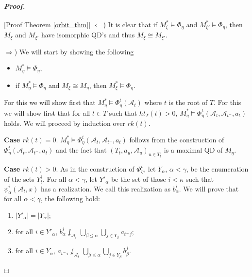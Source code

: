 \documentclass[12pt,a4paper]{amsart}
\theoremstyle{definition}
\theoremstyle{remark}
\newenvironment{cproof}{\paragraph{\emph{Proof.\,}}}{\hfill{$\boxminus$}\par\vspace{2mm}}
\begin{document}
\begin{cproof}[Proof Theorem \ref{orbit_thm}]
$\Leftarrow$) It is clear that if $M^*_\xi\models \Phi_\eta$ and $M^*_{\xi'}\models \Phi_\eta$, then $M_\xi$ and $M_{\xi'}$ have isomorphic QD's and thus $M_\xi\cong M_{\xi'}$.


$\Rightarrow$) We will start by showing the following
\begin{itemize}
    \item $M_\eta^*\models \Phi_\eta$,
    \item if $M_\eta^*\models \Phi_\eta$ and $M_\xi\cong M_\eta$, then $M_\xi^*\models\Phi_\eta$. 
\end{itemize}

For this we will show first that $M_\eta^*\models\Phi_\eta^t(\mathcal{A}_t)$ where $t$ is the root of $T$. For this we will show first that for all $t\in T$ such that $ht_T(t)>0$,  $M_\eta^*\models\Phi_\eta^t(\mathcal{A}_t,\mathcal{A}_{t^-},a_t)$ holds. We will proceed by induction over $rk(t)$. 



{\bf Case $rk(t)=0$}. $M_\eta^*\models\Phi_\eta^t(\mathcal{A}_t,\mathcal{A}_{t^-},a_t)$ follows from the construction of $\Phi_\eta^t(\mathcal{A}_t,\mathcal{A}_{t^-},a_t)$ and the fact that $(T_t,a_u,\mathcal{A}_u)_{u\in T_t}$ is a maximal QD of $M_\eta$.

{\bf Case $rk(t)>0$}. As in the construction of $\Phi^t_\eta$, let $Y_\alpha$, $\alpha<\gamma$, be the enumeration of the sets $Y_t^i$. For all $\alpha<\gamma$, let $Y'_\alpha$  be the set of those $i<\kappa$ such that $\psi_\alpha^i(\mathcal{A}_t,x)$ has a realization.
We call this realization as $b_\alpha^i$. We will prove that for all $\alpha<\gamma$, the following hold:
\begin{enumerate}
    \item $|Y'_\alpha|=|Y_\alpha|$;
    \item for all $i\in Y'_\alpha$, $b_\alpha^i\not\downarrow_{\mathcal{A}_t}\bigcup_{\beta\leq \alpha}\bigcup_{j\in Y_\beta}a_{t^\frown j}$;
    \item for all $i\in Y_\alpha$, $a_{t^\frown i}\not\downarrow_{\mathcal{A}_t}\bigcup_{\beta\leq \alpha}\bigcup_{j\in Y_\beta}b_\beta^j$.    
\end{enumerate}


\end{cproof}
\end{document}
